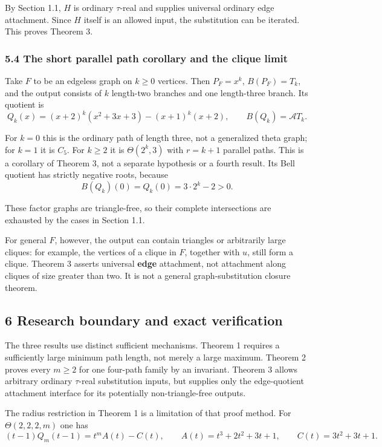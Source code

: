 \documentclass[
  11pt,
  a4paper,
]{article}
\begin{document}
By Section 1.1, \(H\) is ordinary \(\tau\)-real and supplies universal
ordinary edge attachment. Since \(H\) itself is an allowed input, the
substitution can be iterated. This proves Theorem 3.

\subsubsection{5.4 The short parallel path corollary and the clique
limit}\label{the-short-parallel-path-corollary-and-the-clique-limit}

Take \(F\) to be an edgeless graph on \(k\geq0\) vertices. Then
\(P_F=x^k\), \(B(P_F)=T_k\), and the output consists of \(k\) length-two
branches and one length-three branch. Its quotient is
\nopagebreak
\[
Q_k(x)=(x+2)^k(x^2+3x+3)-(x+1)^k(x+2),\qquad
B(Q_k)=\mathcal A T_k.\tag{40}
\]

For \(k=0\) this is the ordinary path of length three, not a generalized
theta graph; for \(k=1\) it is \(C_5\). For \(k\geq2\) it is
\(\Theta(2^k,3)\) with \(r=k+1\) parallel paths. This is a corollary of
Theorem 3, not a separate hypothesis or a fourth result. Its Bell
quotient has strictly negative roots, because
\nopagebreak
\[
B(Q_k)(0)=Q_k(0)=3\cdot2^k-2>0.
\]

These factor graphs are triangle-free, so their complete intersections
are exhausted by the cases in Section 1.1.

For general \(F\), however, the output can contain triangles or
arbitrarily large cliques: for example, the vertices of a clique in
\(F\), together with \(u\), still form a clique. Theorem 3 asserts
universal \textbf{edge} attachment, not attachment along cliques of size
greater than two. It is not a general graph-substitution closure
theorem.

\subsection{6 Research boundary and exact
verification}\label{research-boundary-and-exact-verification}

The three results use distinct sufficient mechanisms. Theorem 1 requires
a sufficiently large minimum path length, not merely a large maximum.
Theorem 2 proves every \(m\geq2\) for one four-path family by an
invariant. Theorem 3 allows arbitrary ordinary \(\tau\)-real
substitution inputs, but supplies only the edge-quotient attachment
interface for its potentially non-triangle-free outputs.

The radius restriction in Theorem 1 is a limitation of that proof
method. For \(\Theta(2,2,2,m)\) one has
\nopagebreak
\[
(t-1)Q_m(t-1)=t^m A(t)-C(t),\qquad
A(t)=t^3+2t^2+3t+1,\qquad C(t)=3t^2+3t+1.
\]
\end{document}
